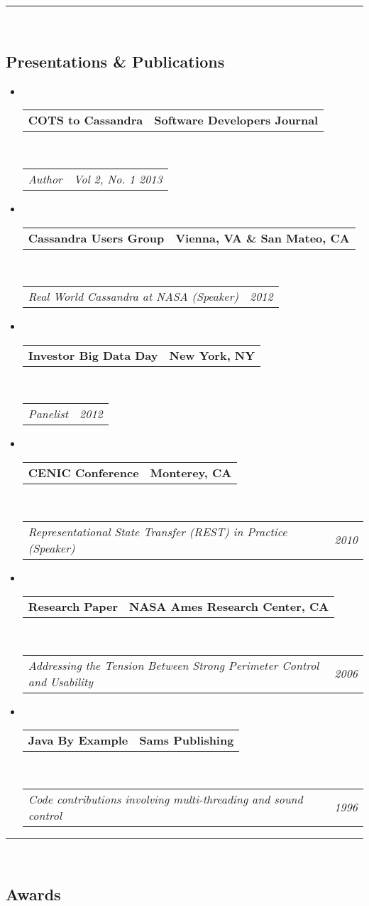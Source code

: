 \documentclass[10pt,letterpaper]{article}
\makeatletter
\newcommand{\headerrow}[2]
{\begin{tabular*}{\linewidth}{l@{\extracolsep{\fill}}r}
	#1 &
	#2 \\
\end{tabular*}}
\makeatother
\begin{document}
\hrule\
\vspace{-0.4em}
\subsection*{Presentations \& Publications}

\begin{itemize}
	\parskip=0.1em
	\item\ 
	\headerrow
		{\textbf{COTS to Cassandra}}
		{\textbf{Software Developers Journal}}
	\\
	\headerrow
		{\emph{Author}}
		{\emph{Vol 2, No. 1 2013}}
    \item\ 
	\headerrow
		{\textbf{Cassandra Users Group}}
		{\textbf{Vienna, VA \& San Mateo, CA}}
	\\
	\headerrow
		{\emph{Real World Cassandra at NASA (Speaker)}}
		{\emph{2012}}
	\item\
	\headerrow
		{\textbf{Investor Big Data Day}}
		{\textbf{New York, NY}}
	\\
	\headerrow
		{\emph{Panelist}}
		{\emph{2012}} 
	\item\
    \headerrow
		{\textbf{CENIC Conference}}
		{\textbf{Monterey, CA}}
	\\
	\headerrow
		{\emph{Representational State Transfer (REST) in Practice (Speaker)}}
		{\emph{2010}}
	\item\ 
	\headerrow
		{\textbf{Research Paper}}
		{\textbf{NASA Ames Research Center, CA}}
	\\
	\headerrow
		{\emph{Addressing the Tension Between Strong Perimeter Control and Usability}}
		{\emph{2006}}
	\item\ 
	\headerrow
		{\textbf{Java By Example}}
		{\textbf{Sams Publishing}}
	\\
	\headerrow
		{\emph{Code contributions involving multi-threading and sound control}}
		{\emph{1996}}
\end{itemize}


\hrule\
\vspace{-0.4em}
\subsection*{Awards}
\end{document}
